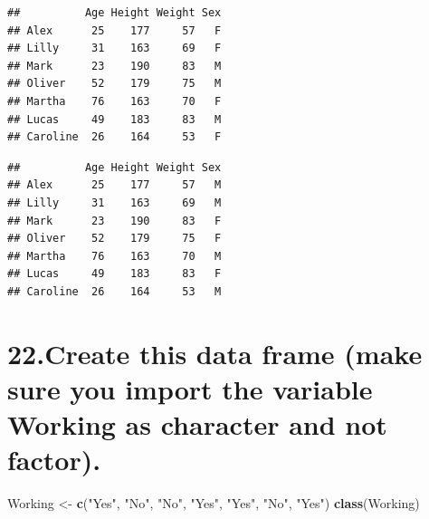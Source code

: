 \documentclass[]{article}
\newenvironment{Shaded}{\begin{snugshade}}{\end{snugshade}}
\newcommand{\DataTypeTok}[1]{\textcolor[rgb]{0.13,0.29,0.53}{#1}}
\newcommand{\KeywordTok}[1]{\textcolor[rgb]{0.13,0.29,0.53}{\textbf{#1}}}
\newcommand{\NormalTok}[1]{#1}
\newcommand{\OperatorTok}[1]{\textcolor[rgb]{0.81,0.36,0.00}{\textbf{#1}}}
\newcommand{\StringTok}[1]{\textcolor[rgb]{0.31,0.60,0.02}{#1}}
\begin{document}
\begin{verbatim}
##          Age Height Weight Sex
## Alex      25    177     57   F
## Lilly     31    163     69   F
## Mark      23    190     83   M
## Oliver    52    179     75   M
## Martha    76    163     70   F
## Lucas     49    183     83   M
## Caroline  26    164     53   F
\end{verbatim}

\begin{Shaded}
\end{Shaded}

\begin{verbatim}
##          Age Height Weight Sex
## Alex      25    177     57   M
## Lilly     31    163     69   M
## Mark      23    190     83   F
## Oliver    52    179     75   F
## Martha    76    163     70   M
## Lucas     49    183     83   F
## Caroline  26    164     53   M
\end{verbatim}

\hypertarget{create-this-data-frame-make-sure-you-import-the-variable-working-as-character-and-not-factor.}{%
\section{22.Create this data frame (make sure you import the variable
Working as character and not
factor).}\label{create-this-data-frame-make-sure-you-import-the-variable-working-as-character-and-not-factor.}}

\begin{Shaded}
\begin{Highlighting}[]
\NormalTok{Working <-}\StringTok{ }\KeywordTok{c}\NormalTok{(}\StringTok{"Yes"}\NormalTok{, }\StringTok{"No"}\NormalTok{, }\StringTok{"No"}\NormalTok{, }\StringTok{"Yes"}\NormalTok{, }\StringTok{"Yes"}\NormalTok{, }\StringTok{"No"}\NormalTok{, }\StringTok{"Yes"}\NormalTok{)}
\KeywordTok{class}\NormalTok{(Working)}
\end{Highlighting}
\end{Shaded}
\end{document}
